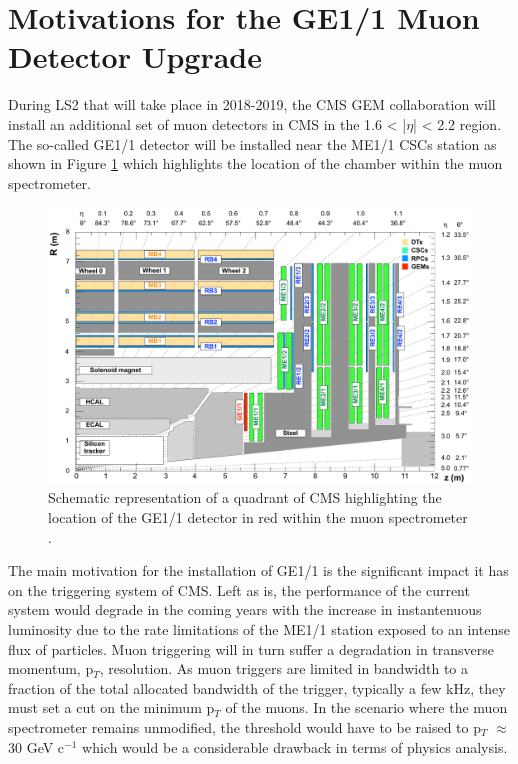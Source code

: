   \section{Motivations for the GE1/1 Muon Detector Upgrade}

    During LS2 that will take place in 2018-2019, the CMS GEM collaboration \cite{Colaleo:2021453} will install an additional set of muon detectors in CMS in the 1.6 < |$\eta$| < 2.2 region. The so-called GE1/1 detector will be installed near the ME1/1 CSCs station as shown in Figure \ref{fig:II-1-gem-ge11} which highlights the location of the chamber within the muon spectrometer. \\

    \begin{figure}[h!]
      \centering
      \includegraphics[width=\textwidth]{img/II-1-gem/ge11-quadrant.pdf}
      \caption{Schematic representation of a quadrant of CMS highlighting the location of the GE1/1 detector in red within the muon spectrometer \cite{Colaleo:2021453}.}
      \label{fig:II-1-gem-ge11}
    \end{figure}

    The main motivation for the installation of GE1/1 is the significant impact it has on the triggering system of CMS. Left as is, the performance of the current system would degrade in the coming years with the increase in instantenuous luminosity due to the rate limitations of the ME1/1 station exposed to an intense flux of particles. Muon triggering will in turn suffer a degradation in transverse momentum, p$_T$, resolution. As muon triggers are limited in bandwidth to a fraction of the total allocated bandwidth of the trigger, typically a few kHz, they must set a cut on the minimum p$_T$ of the muons. In the scenario where the muon spectrometer remains unmodified, the threshold would have to be raised to p$_T$ $ \approx $ 30 GeV c$^{-1}$ which would be a considerable drawback in terms of physics analysis. \\

